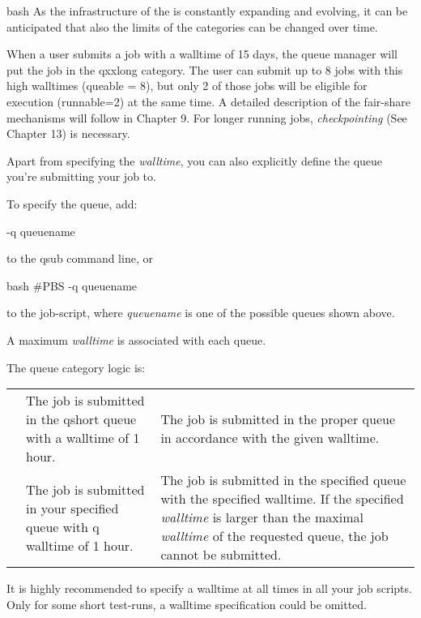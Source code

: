 \begin{code}{bash}
 As the infrastructure of the \hpc is constantly expanding
and evolving, it can be anticipated that also the limits of the categories can
be changed over time.

When a user submits a job with a walltime of 15 days, the queue manager will
put the job in the qxxlong category.  The user can submit up to 8 jobs with
this high walltimes (queable = 8), but only 2 of those jobs will be eligible
for execution (runnable=2) at the same time.  A detailed description of the
fair-share mechanisms will follow in Chapter 9. For longer running jobs,
\emph{checkpointing} (See Chapter 13) is necessary.

Apart from specifying the \emph{walltime}, you can also explicitly define the
queue you're submitting your job to.

To specify the queue, add:
\begin{prompt}
-q queuename
\end{prompt}
to the qsub command line, or
\begin{code}{bash}
#PBS -q queuename
\end{code}

to the job-script, where \emph{queuename} is one of the possible queues shown
above.

A maximum \emph{walltime} is associated with each queue.

The queue category logic is:

\begin{tabular}{|p{0.9in}|p{1.3in}|p{1.7in}|} \hline
                                     & \strong{No walltime specified}                                          & \strong{Walltime specified} \\ \hline
\strong{No queue \newline specified} & The job is submitted in the qshort queue with a walltime of 1 hour.     & The job is submitted in the proper queue in accordance with the given walltime. \\ \hline
\strong{Queue \newline specified}    & The job is submitted in your specified
  queue with q walltime of 1 hour. & The job is submitted in the specified
  queue with the specified walltime. If the specified \textit{walltime} is
  larger than the maximal \textit{walltime} of the requested queue, the job
  cannot be submitted. \\ \hline
\end{tabular}

 It is highly recommended to specify a walltime at all times
in all your job scripts. Only for some short test-runs, a walltime
specification could be omitted.


\end{code}
